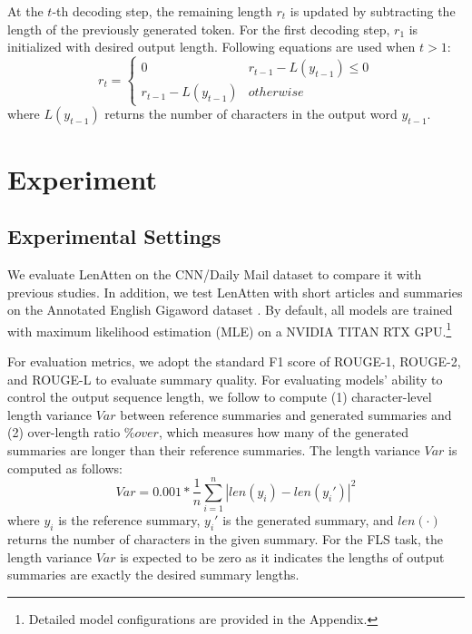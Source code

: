 \documentclass[11pt,a4paper]{article}
\begin{document}
At the $t$-th decoding step, the remaining length $r_t$ is updated by subtracting the length of the previously generated token. For the first decoding step, $r_1$ is initialized with desired output length. Following equations are used when $t>1$:
\begin{equation}
  r_{t} =
\begin{cases}
 0 & r_{t-1}- L(y_{t-1})  \leq 0 \\
 r_{t-1}- L(y_{t-1}) & otherwise
\end{cases}
\end{equation}
where $L(y_{t-1})$ returns the number of characters in the output word $y_{t-1}$.

\section{Experiment}

\subsection{Experimental Settings}
We evaluate LenAtten on the CNN/Daily Mail dataset \citep{see-etal-2017-get} to compare it with previous studies. In addition, we test LenAtten with short articles and summaries on the Annotated English Gigaword dataset \citep{rush-etal-2015-neural}. By default, all models are trained with maximum likelihood estimation (MLE) on a NVIDIA TITAN RTX GPU.\footnote{Detailed model configurations are provided in the Appendix.}
 
For evaluation metrics, we adopt the standard F1 score of ROUGE-1, ROUGE-2, and ROUGE-L \citep{lin-2004-rouge} to evaluate summary quality. For evaluating models' ability to control the output sequence length, we follow \citep{makino-etal-2019-global} to compute (1) character-level length variance $Var$ between reference summaries and generated summaries and (2) over-length ratio $\%over$, which measures how many of the generated summaries are longer than their reference summaries. The length variance $Var$ is computed as follows:
\begin{equation}
    Var = 0.001 * \frac{1}{n} \sum_{i=1}^n |len(y_i) - len(y_i')|^2
\end{equation} where $y_i$ is the reference summary, $y_i'$ is the generated summary, and $len(\cdot)$ returns the number of characters in the given summary. For the FLS task, the length variance $Var$ is expected to be zero as it indicates the lengths of output summaries are exactly the desired summary lengths.
\end{document}
